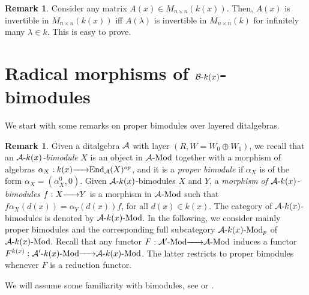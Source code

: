 \documentclass{article}
\theoremstyle{definition}
\newtheorem{remark}[theorem]{Remark}
\newcommand{\End}{{ \rm End }}
\newcommand{\Mod}{{ \rm Mod }}
\newcommand{\g}{\hbox{-}}
\newcommand{\rightmap}[1]{\smash{\mathop{\hbox to 
20pt{\rightarrowfill}}\limits^{#1}}}
\begin{document}
\begin{remark}\label{L: matrices racionales invertibles} Consider any matrix $A(x)\in M_{n\times n}(k(x))$. Then, $A(x)$ is invertible in $M_{n\times n}(k(x))$
iff $A(\lambda)$ is invertible in $M_{n\times n}(k)$ for infinitely many $\lambda\in k$. 
This  is easy to prove.
\end{remark}





\section{Radical morphisms of ${\cal B}\g k(x)$-bimodules}

We start with some  remarks on proper bimodules over layered ditalgebras. 


\begin{remark}\label{R: reminder de bimods, ext y forget-embed}
Given a ditalgebra ${\cal A}$ with layer $(R,W=W_0\oplus W_1)$, 
 we recall that an \emph{${\cal A}\g k(x)$-bimodule}  $X$ is an object in ${\cal A}\g \Mod$ together with a morphism of algebras $\alpha_X:k(x)\rightmap{}\End_{\cal A}(X)^{op}$, and it is a \emph{proper bimodule} if $\alpha_X$ is of the form $\alpha_X=(\alpha^0_X,0)$. Given ${\cal A}\g k(x)$-bimodules $X$ and $Y$,  a \emph{morphism of ${\cal A}\g k(x)$-bimodules} $f:X\rightmap{}Y$ is a morphism in ${\cal A}\g\Mod$ such that $f\alpha_X(d(x))=\alpha_Y(d(x))f$, for all $d(x)\in k(x)$. The category of ${\cal A}\g k(x)$-bimodules is denoted by ${\cal A}\g k(x)\g\Mod$. In the following, we consider mainly proper bimodules and  the corresponding full subcategory ${\cal A}\g k(x)\g\Mod_p$ of ${\cal A}\g k(x)\g\Mod$.  Recall that any functor $F:{\cal A}'\g\Mod\rightmap{}{\cal A}\g\Mod$ induces a functor $F^{k(x)}:{\cal A}'\g k(x)\g \Mod\rightmap{}{\cal A}\g k(x)\g\Mod$. The latter restricts to proper bimodules whenever $F$ is a reduction functor. 
 
  We will assume some familiarity with bimodules, see \cite{CB2} or \cite{BSZ}. 
 \end{remark}
 
\end{document}
